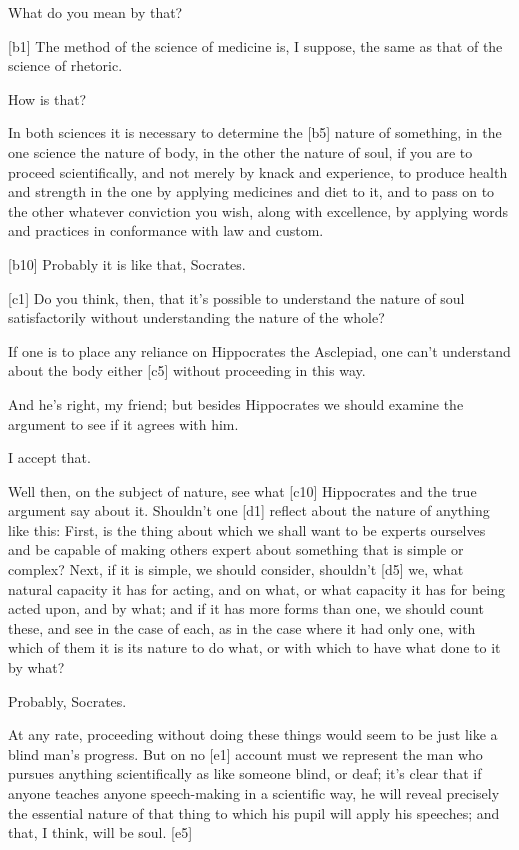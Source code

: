  What do you mean by that?

{[}b1{]}  The method of the science of medicine is, I suppose,
the same as that of the science of rhetoric.

 How is that?

 In both sciences it is necessary to determine the {[}b5{]}
nature of something, in the one science the nature of body, in the other
the nature of soul, if you are to proceed scientifically, and not merely
by knack and experience,
to produce health and strength in the one by applying medicines and diet
to it, and to pass on to the other whatever conviction you wish, along
with excellence, by applying
words and practices in
conformance with law and custom.

{[}b10{]}  Probably it is like that, Socrates.

{[}c1{]}  Do you think, then, that it's possible to understand
the nature of soul satisfactorily without understanding the nature of
the whole?

 If one is to place any reliance on Hippocrates the
Asclepiad, one can't
understand about the body either {[}c5{]} without proceeding in this
way.

 And he's right, my friend; but besides Hippocrates we should
examine the argument to
see if it agrees with him.

 I accept that.

 Well then, on the subject of nature, see what {[}c10{]}
Hippocrates and the true argument say about it. Shouldn't one {[}d1{]}
reflect about the nature of anything like this: First, is the thing
about which we shall want to be experts ourselves and be capable of
making others expert about something that is simple or complex? Next, if
it is simple, we should consider, shouldn't {[}d5{]} we, what natural
capacity it has for acting, and on what, or what capacity it has for
being acted upon, and by what; and if it has more
forms than one, we
should count these, and see in the case of each, as in the case where it
had only one, with which of them it is its nature to do what, or with
which to have what done to it by what?

 Probably, Socrates.

 At any rate, proceeding without doing these things would seem
to be just like a blind man's progress. But on no {[}e1{]} account must
we represent the man who pursues anything scientifically as like someone
blind, or deaf; it's clear that if anyone teaches anyone speech-making
in a scientific way, he will reveal precisely the essential nature of
that thing to which his pupil will apply his speeches; and that, I
think, will be soul. {[}e5{]}

